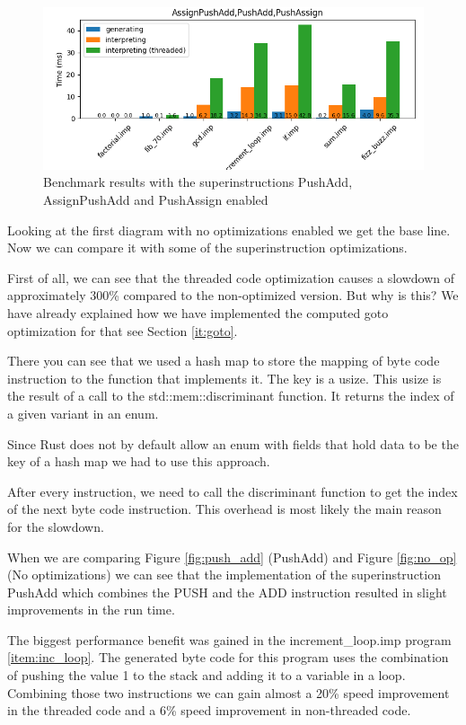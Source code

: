 \documentclass{article}
\begin{document}
\begin{figure}[h]
    \centering
    \includegraphics[width=1\textwidth]{../BenchmarkImages/AssignPushAdd_PushAdd_PushAssign.png}
    \caption{Benchmark results with the superinstructions PushAdd, AssignPushAdd and PushAssign enabled}
    \label{fig:all_op}
\end{figure}

Looking at the first diagram with no optimizations enabled we get the base
line. Now we can compare it with some of the superinstruction optimizations.

First of all, we can see that the threaded code optimization causes a slowdown
of approximately 300\% compared to the non-optimized version. But why is this?
We have already explained how we have implemented the computed goto
optimization for that see Section \ref{it:goto}.

There you can see that we used a hash map to store the mapping of byte code
instruction to the function that implements it. The key is a usize. This usize
is the result of a call to the std::mem::discriminant function. It returns the
index of a given variant in an enum.

Since Rust does not by default allow an enum with fields that hold data to be
the key of a hash map we had to use this approach.

After every instruction, we need to call the discriminant function to get the
index of the next byte code instruction. This overhead is most likely the main
reason for the slowdown.

When we are comparing Figure \ref{fig:push_add} (PushAdd) and Figure
\ref{fig:no_op} (No optimizations) we can see that the implementation of the
superinstruction PushAdd which combines the PUSH and the ADD instruction
resulted in slight improvements in the run time.

The biggest performance benefit was gained in the increment\_loop.imp program
\ref{item:inc_loop}. The generated byte code for this program uses the
combination of pushing the value 1 to the stack and adding it to a variable in
a loop. Combining those two instructions we can gain almost a 20\% speed
improvement in the threaded code and a 6\% speed improvement in non-threaded
code.
\end{document}
